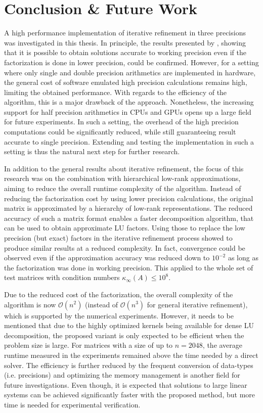 \chapter{Conclusion \& Future Work}
\label{chap:conclusion}

A high performance implementation of iterative refinement in three precisions was investigated in this thesis. In principle, the results presented by \cite{carson_accelerating_2018}, showing that it is possible to obtain solutions accurate to working precision even if the factorization is done in lower precision, could be confirmed. However, for a setting where only single and double precision arithmetics are implemented in hardware, the general cost of software emulated high precision calculations remains high, limiting the obtained performance. With regards to the efficiency of the algorithm, this is a major drawback of the approach. Nonetheless, the increasing support for half precision arithmetics in CPUs and GPUs opens up a large field for future experiments. In such a setting, the overhead of the high precision computations could be significantly reduced, while still guaranteeing result accurate to single precision. Extending and testing the implementation in such a setting is thus the natural next step for further research.

In addition to the general results about iterative refinement, the focus of this research was on the combination with hierarchical low-rank approximations, aiming to reduce the overall runtime complexity of the algorithm. Instead of reducing the factorization cost by using lower precision calculations, the original matrix is approximated by a hierarchy of low-rank representations. The reduced accuracy of such a matrix format enables a faster decomposition algorithm, that can be used to obtain approximate LU factors. Using those to replace the low precision (but exact) factors in the iterative refinement process showed to produce similar results at a reduced complexity. In fact, convergence could be observed even if the approximation accuracy was reduced down to $10^{-2}$ as long as the factorization was done in working precision. This applied to the whole set of test matrices with condition numbers $\kappa_\infty(A) \leq 10^8$. 

Due to the reduced cost of the factorization, the overall complexity of the algorithm is now $\mathcal{O}(n^2)$ (instead of $\mathcal{O}(n^3)$ for general iterative refinement), which is supported by the numerical experiments. However, it needs to be mentioned that due to the highly optimized kernels being available for dense LU decomposition, the proposed variant is only expected to be efficient when the problem size is large. For matrices with a size of up to $n = 2048$, the average runtime measured in the experiments remained above the time needed by a direct solver. The efficiency is further reduced by the frequent conversion of data-types (i.e. precisions) and optimizing the memory management is another field for future investigations. Even though, it is expected that solutions to large linear systems can be achieved significantly faster with the proposed method, but more time is needed for experimental verification.

